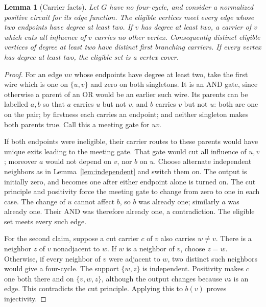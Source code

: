 \documentclass[11pt]{article}
\newtheorem{lemma}[theorem]{Lemma}
\theoremstyle{definition}
\theoremstyle{remark}
\begin{document}
\begin{lemma}[Carrier facts]\label{lem:carrier}
Let $G$ have no four-cycle, and consider a normalized positive circuit
for its edge function. The eligible vertices meet every edge whose two endpoints have
degree at least two. If $v$ has degree at least two, a carrier of $v$
which cuts all influence of $v$ carries no other vertex. Consequently
distinct eligible vertices of degree at least two have distinct first
branching carriers. If every vertex has degree at least two, the eligible
set is a vertex cover.
\end{lemma}
\begin{proof}
For an edge $uv$ whose endpoints have degree at least two, take the first
wire which is one on $\{u,v\}$ and zero
on both singletons. It is an AND gate, since otherwise a parent of an OR
would be an earlier such wire. Its parents can be labelled $a,b$ so that
$a$ carries $u$ but not $v$, and $b$ carries $v$ but not $u$: both are one
on the pair; by firstness each carries an endpoint; and neither singleton
makes both parents true. Call this a meeting gate for $uv$.

If both endpoints were ineligible, their carrier routes to these parents
would have unique exits leading to the meeting gate. That gate would cut
all influence of $u,v$; moreover $a$ would not depend on $v$, nor $b$ on
$u$. Choose alternate independent neighbors as in
Lemma~\ref{lem:independent} and switch them on. The output is initially
zero, and becomes one after either endpoint alone is turned on. The cut
principle and positivity force the meeting gate to change from zero to
one in each case. The change of $u$ cannot affect $b$, so $b$ was already
one; similarly $a$ was already one. Their AND was therefore already one,
a contradiction. The eligible set meets every such edge.

For the second claim, suppose a cut carrier $c$ of $v$ also carries
$w\ne v$. There is a neighbor $z$ of $v$ nonadjacent to $w$. If $w$ is a
neighbor of $v$, choose $z=w$. Otherwise, if every neighbor of $v$ were
adjacent to $w$, two distinct such neighbors would give a four-cycle.
The support $\{w,z\}$ is independent. Positivity makes $c$ one both there
and on $\{v,w,z\}$, although the output changes because $vz$ is an edge.
This contradicts the cut principle. Applying this to $b(v)$ proves
injectivity.
\end{proof}
\end{document}
